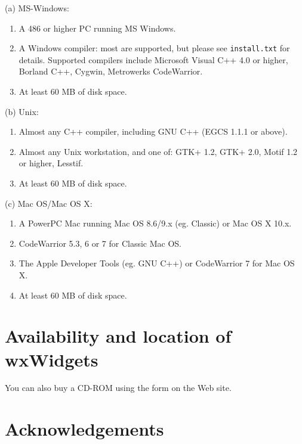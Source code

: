 (a) MS-Windows:

\begin{enumerate}\itemsep=0pt
\item A 486 or higher PC running MS Windows.
\item A Windows compiler: most are supported, but please see {\tt install.txt} for
details. Supported compilers include Microsoft Visual C++ 4.0 or higher, Borland C++, Cygwin,
Metrowerks CodeWarrior.
\item At least 60 MB of disk space.
\end{enumerate}

(b) Unix:

\begin{enumerate}\itemsep=0pt
\item Almost any C++ compiler, including GNU C++ (EGCS 1.1.1 or above).
\item Almost any Unix workstation, and one of: GTK+ 1.2, GTK+ 2.0, Motif 1.2 or higher, Lesstif.
\item At least 60 MB of disk space.
\end{enumerate}

(c) Mac OS/Mac OS X:

\begin{enumerate}\itemsep=0pt
\item A PowerPC Mac running Mac OS 8.6/9.x (eg. Classic) or Mac OS X 10.x.
\item CodeWarrior 5.3, 6 or 7 for Classic Mac OS.
\item The Apple Developer Tools (eg. GNU C++) or CodeWarrior 7 for Mac OS X.
\item At least 60 MB of disk space.
\end{enumerate}

\section{Availability and location of wxWidgets}


You can also buy a CD-ROM using the form on the Web site.

\section{Acknowledgements}

